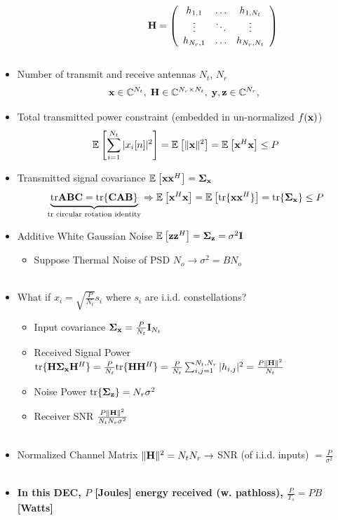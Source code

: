 \documentclass[xcolor=dvipsnames,aspectratio=169]{beamer}
\begin{document}
{\begin{columns}
\begin{column}{6cm}
    \begin{figure}
    
    \end{figure}
\end{column}
\begin{column}{6cm}
    $\mathbf{H}=\left(\begin{array}{cccc}
 h_{1,1}&\dots&h_{1,N_{t}}\\
 \vdots&\ddots&\vdots\\
 h_{N_{r},1}&\dots&h_{N_{r},N_{t}}\\
\end{array}\right)
$
\end{column}
\end{columns}
 \begin{itemize}
 \item Number of transmit and receive antennas $N_{t}$, $N_{r}$
 $$\mathbf{x}\in \mathbb{C}^{N_{t}},\;\mathbf{H}\in \mathbb{C}^{N_{r}\times N_{t}},\;\mathbf{y},\mathbf{z}\in \mathbb{C}^{N_{r}},\;$$
 \item Total transmitted power constraint (embedded in un-normalized $f(\mathbf{x})$)
 $${\mathbb{E}_{}\left[\sum_{i=1}^{N_{t}}|x_i[n]|^2\right]}={\mathbb{E}_{}\left[\|\mathbf{x}\|^2\right]}={\mathbb{E}_{}\left[\mathbf{x}^H\mathbf{x}\right]}\leq P$$
 \item Transmitted signal covariance ${\mathbb{E}_{}\left[\mathbf{x}\mathbf{x}^H\right]}=\mathbf{\boldsymbol{\Sigma}}_{\mathbf{x}}$
 $$\underset{\textnormal{tr circular rotation identity}}{\underbrace{\textnormal{tr}{\mathbf{A}\mathbf{B}\mathbf{C}}=\textnormal{tr}\{\mathbf{C}\mathbf{A}\mathbf{B}\}}}\Rightarrow {\mathbb{E}_{}\left[\mathbf{x}^H\mathbf{x}\right]}={\mathbb{E}_{}\left[\textnormal{tr}\{\mathbf{x}\mathbf{x}^H\}\right]}=\textnormal{tr}\{\mathbf{\boldsymbol{\Sigma}}_{\mathbf{x}}\}\leq P$$
 \pagebreak
 \item Additive White Gaussian Noise ${\mathbb{E}_{}\left[\mathbf{z}\mathbf{z}^H\right]}=\mathbf{\boldsymbol{\Sigma}}_{\mathbf{z}}=\sigma^2\mathbf{I}$
 \begin{itemize}
    \item Suppose Thermal Noise of PSD $N_o\to\sigma^2=BN_o$\\ \ \\
 \end{itemize} 
 \item What if $x_i=\sqrt{\frac{P}{N_{t}}}s_i$ where $s_i$ are i.i.d. constellations?
 \begin{itemize}
    \item Input covariance $\mathbf{\boldsymbol{\Sigma}}_{\mathbf{x}}=\frac{P}{N_{t}}\mathbf{I}_{N_{t}}$
    \item Received Signal Power $\textnormal{tr}\{\mathbf{H}\mathbf{\boldsymbol{\Sigma}}_{\mathbf{x}}\mathbf{H}^H\}=\frac{P}{N_{t}}\textnormal{tr}\{\mathbf{H}\mathbf{H}^H\}=\frac{P}{N_{t}}\sum_{i,j=1}^{N_{t},N_{r}} |h_{i,j}|^2=\frac{P\|\mathbf{H}\|^2}{N_{t}}$
    \item Noise Power $\textnormal{tr}\{\mathbf{\boldsymbol{\Sigma}}_{\mathbf{z}}\}=N_{r}\sigma^2$
    \item Receiver SNR $\frac{P\|\mathbf{H}\|^2}{N_{t}N_{r} \sigma^2}$\\ \ \\
 \end{itemize} 
 \item Normalized Channel Matrix $\|\mathbf{H}\|^2=N_{t}N_{r}\to$ SNR (of i.i.d. inputs) $=\frac{P}{\sigma^2}$ \\ \ \\
 \item \textbf{In this DEC, $P$ [Joules] energy received (w. pathloss), $\frac{P}{T_s}=PB$ [Watts]}
\end{itemize}
}
\end{document}
